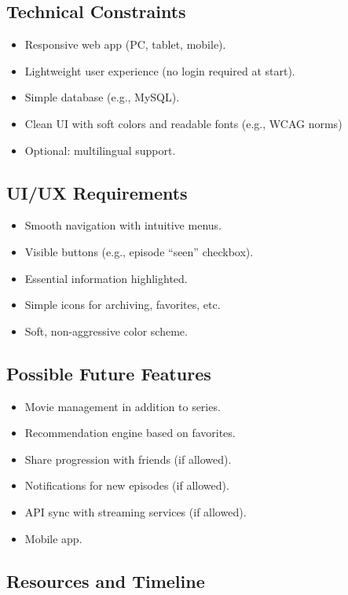 \subsection{Technical Constraints}
\begin{itemize}
    \item Responsive web app (PC, tablet, mobile).
    \item Lightweight user experience (no login required at start).
    \item Simple database (e.g., MySQL).
    \item Clean UI with soft colors and readable fonts (e.g., WCAG norms)
    \item Optional: multilingual support.
\end{itemize}

\subsection{UI/UX Requirements}
\begin{itemize}
    \item Smooth navigation with intuitive menus.
    \item Visible buttons (e.g., episode “seen” checkbox).
    \item Essential information highlighted.
    \item Simple icons for archiving, favorites, etc.
    \item Soft, non-aggressive color scheme.
\end{itemize}

\subsection{Possible Future Features}
\begin{itemize}
    \item Movie management in addition to series.
    \item Recommendation engine based on favorites.
    \item Share progression with friends (if allowed).
    \item Notifications for new episodes (if allowed).
    \item API sync with streaming services (if allowed).
    \item Mobile app.
\end{itemize}

\subsection{Resources and Timeline}

